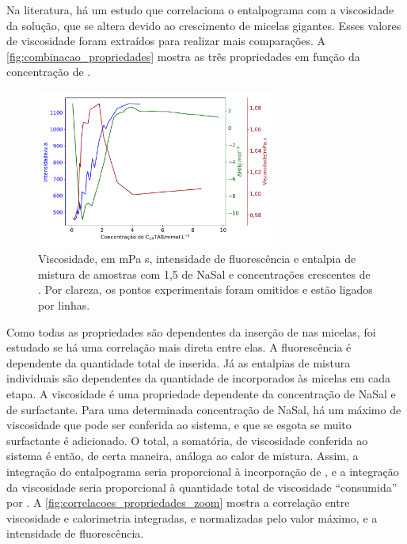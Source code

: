 	Na literatura, há um estudo que correlaciona o entalpograma com a viscosidade da solução, que se altera devido ao crescimento de micelas gigantes.\cite{Ito2015c} Esses valores de viscosidade foram extraídos para realizar mais comparações. A \autoref{fig:combinacao_propriedades} mostra as três propriedades em função da concentração de \TTAB.
	
	\begin{figure}[h]
		\centering
		\includegraphics[width=0.7\textwidth]{imagens/fluor/combinacao_propriedades}
		\caption{Viscosidade, em mPa s, intensidade de fluorescência e entalpia de mistura de amostras com 1,5 \mM{} de NaSal e concentrações crescentes de \TTAB. Por clareza, os pontos experimentais foram omitidos e estão ligados por linhas.}
		\label{fig:combinacao_propriedades}
	\end{figure} 
	
	Como todas as propriedades são dependentes da inserção de \Sal{} nas micelas, foi estudado se há uma correlação mais direta entre elas. A fluorescência é dependente da quantidade total de \Sal{} inserida. Já as entalpias de mistura individuais são dependentes da quantidade de \Sal{} incorporados às micelas em cada etapa. A viscosidade é uma propriedade dependente da concentração de NaSal e de surfactante. Para uma determinada concentração de NaSal, há um máximo de viscosidade que pode ser conferida ao sistema, e que se esgota se muito surfactante é adicionado. O total, a somatória, de viscosidade conferida ao sistema é então, de certa maneira, análoga ao calor de mistura. Assim, a integração do entalpograma seria proporcional à incorporação de \Sal{}, e a integração da viscosidade seria proporcional à quantidade total de viscosidade ``consumida'' por \TTAB. A  \autoref{fig:correlacoes_propriedades_zoom} mostra a correlação entre viscosidade e calorimetria integradas, e normalizadas pelo valor máximo, e a intensidade de fluorescência.
	
